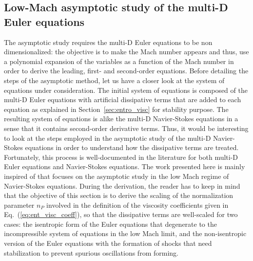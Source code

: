 \documentclass[preprint,10pt]{elsarticle}
\newcommand{\eqt}[1]{Eq.~(\ref{#1})}                     %
\newcommand{\sct}[1]{Section~\ref{#1}}                   %
\begin{document}
\subsection{Low-Mach asymptotic study of the multi-D Euler equations} \label{sec:lowMach}
The asymptotic study requires the multi-D Euler equations to be non dimensionalized: the objective is to make the Mach number appears and thus, use a polynomial expansion of the variables as a function of the Mach number in order to derive the leading, first- and second-order equations. Before detailing the steps of the asymptotic method, let us have a closer look at the system of equations under consideration. The initial system of equations is composed of the multi-D Euler equations with artificial dissipative terms that are added to each equation as explained in \sct{sec:entro_visc} for stability purpose. The resulting system of equations is alike the multi-D Navier-Stokes equations in a sense that it contains second-order derivative terms. Thus, it would be interesting to look at the steps employed in the asymptotic study of the multi-D Navier-Stokes equations in order to understand how the dissipative terms are treated. Fortunately, this process is well-documented in the literature \cite{LowMach1, LowMach2, LowMach3} for both multi-D Euler equations and Navier-Stokes equations. The work presented here is mainly inspired of \cite{Muller} that focuses on the asymptotic study in the low Mach regime of Navier-Stokes equations. During the derivation, the reader has to keep in mind that the objective of this section is to derive the scaling of the normalization parameter $n_P$ involved in the definition of the viscosity coefficients given in \eqt{eq:ent_visc_coeff}, so that the dissipative terms are well-scaled for two cases: the isentropic form of the Euler equations that degenerate to the incompressible system of equations in the low Mach limit, and the non-isentropic version of the Euler equations with the formation of shocks that need stabilization to prevent spurious oscillations from forming.\\
\end{document}
